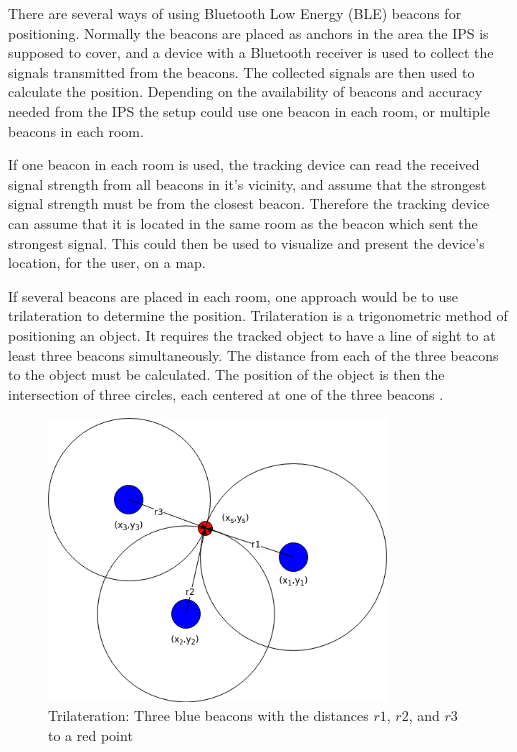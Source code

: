 \documentclass[../Main/thesis.tex]{subfiles}
\begin{document}
There are several ways of using Bluetooth Low Energy (BLE) beacons for positioning.
Normally the beacons are placed as anchors in the area the IPS is supposed to cover, and a device with a Bluetooth receiver is used to collect the signals transmitted from the beacons.
The collected signals are then used to calculate the position.
Depending on the availability of beacons and accuracy needed from the IPS the setup could use one beacon in each room, or multiple beacons in each room.

If one beacon in each room is used, the tracking device can read the received signal strength from all beacons in it's vicinity, and assume that the strongest signal strength must be from the closest beacon.
Therefore the tracking device can assume that it is located in the same room as the beacon which sent the strongest signal.
This could then be used to visualize and present the device's location, for the user, on a map.

If several beacons are placed in each room, one approach would be to use trilateration to determine the position.
Trilateration is a trigonometric method of positioning an object.
It requires the tracked object to have a line of sight to at least three beacons simultaneously.
The distance from each of the three beacons to the object must be calculated.
The position of the object is then the intersection of three circles, each centered at one of the three beacons \citep{Chawathe}.

\begin{figure}[h]
	\centering
	\includegraphics[width=0.8\textwidth]{../fig/Trilaterering}
	\caption{Trilateration: Three blue beacons with the distances $r1$, $r2$, and $r3$ to a red point}
	\label{fig:trilateration}
\end{figure}
\end{document}
